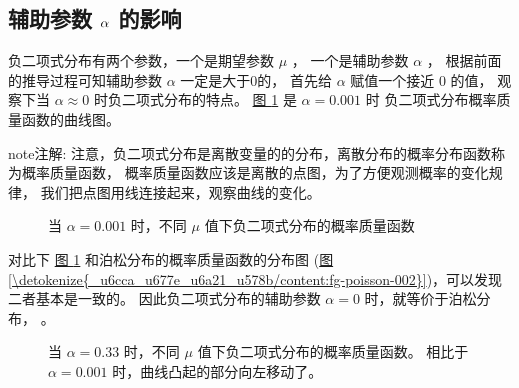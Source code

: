 \documentclass[letterpaper,10pt,english]{sphinxmanual}
\begin{document}
\subsection{辅助参数 \protect\(\alpha\protect\) 的影响}
\label{\detokenize{_u8d1f_u4e8c_u9879_u6a21_u578b/content:alpha}}
负二项式分布有两个参数，一个是期望参数 \(\mu\) ，
一个是辅助参数 \(\alpha\) ，
根据前面的推导过程可知辅助参数 \(\alpha\) 一定是大于0的，
首先给 \(\alpha\) 赋值一个接近 \(0\) 的值，
观察下当 \(\alpha \approx 0\) 时负二项式分布的特点。
\hyperref[\detokenize{_u8d1f_u4e8c_u9879_u6a21_u578b/content:fg-nb-alpha-0-001}]{图 \ref{\detokenize{_u8d1f_u4e8c_u9879_u6a21_u578b/content:fg-nb-alpha-0-001}}} 是 \(\alpha=0.001\) 时
负二项式分布概率质量函数的曲线图。

\begin{sphinxadmonition}{note}{注解:}
注意，负二项式分布是离散变量的的分布，离散分布的概率分布函数称为概率质量函数，
概率质量函数应该是离散的点图，为了方便观测概率的变化规律，
我们把点图用线连接起来，观察曲线的变化。
\end{sphinxadmonition}

\begin{figure}[htbp]
\centering
\capstart

\noindent{}
\caption{当 \(\alpha=0.001\) 时，不同 \(\mu\) 值下负二项式分布的概率质量函数}\label{\detokenize{_u8d1f_u4e8c_u9879_u6a21_u578b/content:id13}}\label{\detokenize{_u8d1f_u4e8c_u9879_u6a21_u578b/content:fg-nb-alpha-0-001}}\end{figure}

对比下 \hyperref[\detokenize{_u8d1f_u4e8c_u9879_u6a21_u578b/content:fg-nb-alpha-0-001}]{图 \ref{\detokenize{_u8d1f_u4e8c_u9879_u6a21_u578b/content:fg-nb-alpha-0-001}}} 和泊松分布的概率质量函数的分布图
(\hyperref[\detokenize{_u6cca_u677e_u6a21_u578b/content:fg-poisson-002}]{图 \ref{\detokenize{_u6cca_u677e_u6a21_u578b/content:fg-poisson-002}}})，可以发现二者基本是一致的。
因此负二项式分布的辅助参数 \(\alpha=0\) 时，就等价于泊松分布，
 。

\begin{figure}[htbp]
\centering
\capstart

\noindent{}
\caption{当 \(\alpha=0.33\) 时，不同 \(\mu\) 值下负二项式分布的概率质量函数。
相比于 \(\alpha=0.001\) 时，曲线凸起的部分向左移动了。}\label{\detokenize{_u8d1f_u4e8c_u9879_u6a21_u578b/content:id14}}\label{\detokenize{_u8d1f_u4e8c_u9879_u6a21_u578b/content:fg-nb-alpha-0-33}}\end{figure}
\end{document}
